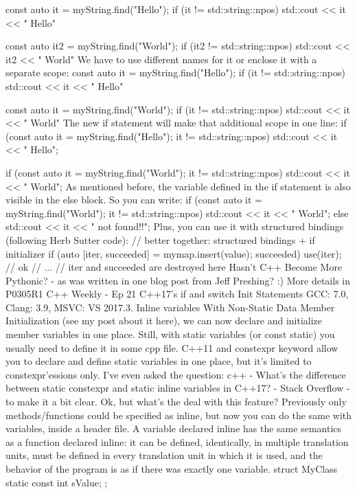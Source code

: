 const auto it = myString.find("Hello");
if (it != std::string::npos)
    std::cout << it << " Hello\n"

const auto it2 = myString.find("World");
if (it2 != std::string::npos)
    std::cout << it2 << " World\n"
We have to use different names for it or enclose it with a separate scope:
{
    const auto it = myString.find("Hello");
    if (it != std::string::npos)
        std::cout << it << " Hello\n"
}

{
    const auto it = myString.find("World");
    if (it != std::string::npos)
        std::cout << it << " World\n"
}
The new if statement will make that additional scope in one line:
if (const auto it = myString.find("Hello"); it != std::string::npos)
    std::cout << it << " Hello\n";

if (const auto it = myString.find("World"); it != std::string::npos)
    std::cout << it << " World\n";
As mentioned before, the variable defined in the if statement is also visible in the else block. So you can write:
if (const auto it = myString.find("World"); it != std::string::npos)
    std::cout << it << " World\n";
else
    std::cout << it << " not found!!\n";
Plus, you can use it with structured bindings (following Herb Sutter code):
// better together: structured bindings + if initializer
if (auto [iter, succeeded] = mymap.insert(value); succeeded) {
    use(iter);  // ok
    // ...
} // iter and succeeded are destroyed here
Hasn’t C++ Become More Pythonic? - as was written in one blog post from Jeff Preshing? :)
More details in 
P0305R1
C++ Weekly - Ep 21 C++17’s if and switch Init Statements
GCC: 7.0, Clang: 3.9, MSVC: VS 2017.3.
Inline variables
With Non-Static Data Member Initialization (see my post about it here), we can now declare and initialize member variables in one place. Still, with static variables (or const static) you usually need to define it in some cpp file.
C++11 and constexpr keyword allow you to declare and define static variables in one place, but it’s limited to constexpr’essions only. I’ve even asked the question: c++ - What’s the difference between static constexpr and static inline variables in C++17? - Stack Overflow - to make it a bit clear.
Ok, but what’s the deal with this feature?
Previously only methods/functions could be specified as inline, but now you can do the same with variables, inside a header file.
A variable declared inline has the same semantics as a function declared inline: it can be defined, identically, in multiple translation units, must be defined in every translation unit in which it is used, and the behavior of the program is as if there was exactly one variable.
struct MyClass
{
    static const int sValue;
};

